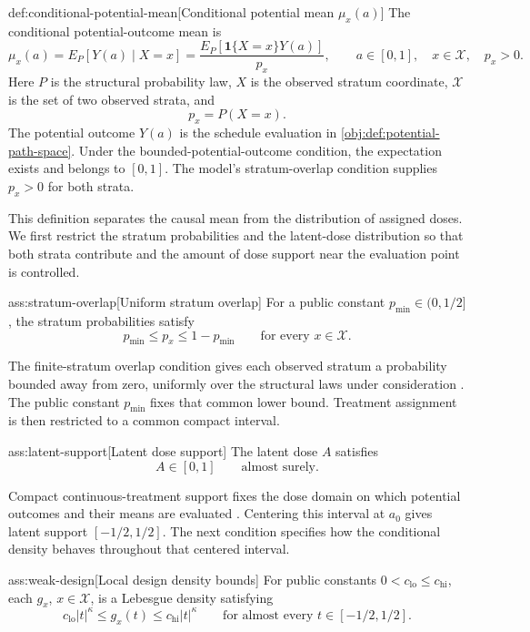 \documentclass[11pt]{article}
\begin{document}
\begin{definitionv}{def:conditional-potential-mean}[Conditional potential mean \(\mu_x(a)\)]
The conditional potential-outcome mean is
\[
\mu_x(a)
=
E_P[Y(a)\mid X=x]
=
\frac{E_P[\mathbf1\{X=x\}Y(a)]}{p_x},
\qquad a\in[0,1],\quad x\in\mathcal X,\quad p_x>0.
\]
Here \(P\) is the structural probability law, \(X\) is the observed stratum coordinate, \(\mathcal X\) is the set of two observed strata, and
\[
p_x=P(X=x).
\]
The potential outcome \(Y(a)\) is the schedule evaluation in \cref{obj:def:potential-path-space}. Under the bounded-potential-outcome condition, the expectation exists and belongs to \([0,1]\). The model's stratum-overlap condition supplies \(p_x>0\) for both strata.
\end{definitionv}

This definition separates the causal mean from the distribution of assigned doses. We first restrict the stratum probabilities and the latent-dose distribution so that both strata contribute and the amount of dose support near the evaluation point is controlled.

\begin{assumptionv}{ass:stratum-overlap}[Uniform stratum overlap]
For a public constant \(p_{\min}\in(0,1/2]\), the stratum probabilities satisfy
\[
p_{\min}\le p_x\le 1-p_{\min}
\qquad\text{for every }x\in\mathcal X.
\]
\end{assumptionv}

The finite-stratum overlap condition gives each observed stratum a probability bounded away from zero, uniformly over the structural laws under consideration \citep{HuangZhang2023}. The public constant \(p_{\min}\) fixes that common lower bound. Treatment assignment is then restricted to a common compact interval.

\begin{assumptionv}{ass:latent-support}[Latent dose support]
The latent dose \(A\) satisfies
\[
A\in[0,1]\qquad\text{almost surely}.
\]
\end{assumptionv}

Compact continuous-treatment support fixes the dose domain on which potential outcomes and their means are evaluated \citep{HuangZhang2023}. Centering this interval at \(a_0\) gives latent support \([-1/2,1/2]\). The next condition specifies how the conditional density behaves throughout that centered interval.

\begin{assumptionv}{ass:weak-design}[Local design density bounds]
For public constants \(0<c_{\mathrm{lo}}\le c_{\mathrm{hi}}\), each \(g_x\), \(x\in\mathcal X\), is a Lebesgue density satisfying
\[
c_{\mathrm{lo}}|t|^\kappa
\le g_x(t)\le
c_{\mathrm{hi}}|t|^\kappa
\qquad\text{for almost every }t\in[-1/2,1/2].
\]
\end{assumptionv}
\end{document}

